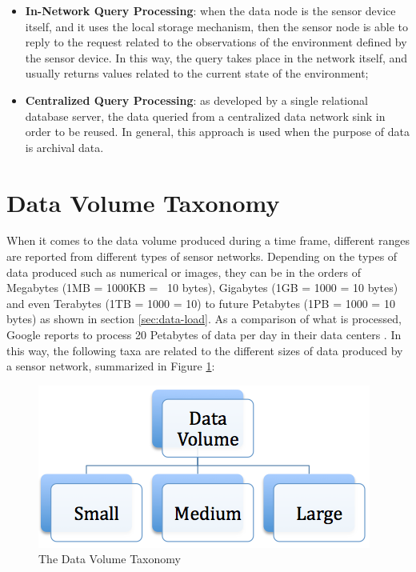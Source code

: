 \begin{itemize}
  \item \textbf{In-Network Query Processing}: when the data node is the
  sensor device itself, and it uses the local storage mechanism, then the
  sensor node is able to reply to the request related to the observations of the 
  environment defined by the sensor device. In this way, the query takes 
  place in the network itself, and usually returns values related to the current
  state of the environment;
  \item \textbf{Centralized Query Processing}: as developed by a single 
  relational database server, the data queried from a centralized data
  network sink in order to be reused. In general, this approach is used when
  the purpose of data is archival data.
\end{itemize}

\section{Data Volume Taxonomy}

When it comes to the data volume produced during a time frame, different ranges
are reported from different types of sensor networks. Depending on the types
of data produced such as numerical or images, they can be in the orders of
Megabytes (1MB = 1000KB = ~10 bytes), Gigabytes (1GB =
1000 = 10 bytes) and even Terabytes (1TB =
1000 = 10) to future Petabytes (1PB =
1000 = 10 bytes) as shown in section
\ref{sec:data-load}. As a comparison of what is processed, Google reports to
process 20 Petabytes of data per day in their data centers
\cite{map-reduce-load}. In this way, the following taxa are related to the
different sizes of data produced by a sensor network, summarized in Figure
\ref{fig:taxonomy-data-volume}:

\begin{figure}[h]
  \centering
  \includegraphics[scale=0.5]{../diagrams/taxonomy-data-volume}
  \caption{The Data Volume Taxonomy}
  \label{fig:taxonomy-data-volume}
\end{figure}

